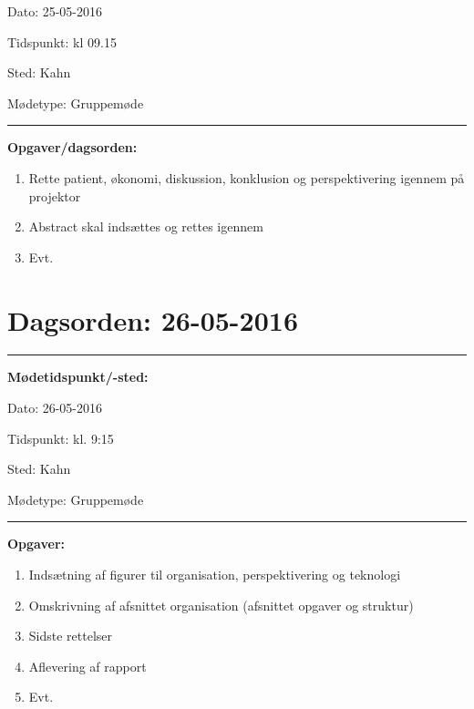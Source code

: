 Dato: \tabto{7em} 25-05-2016

Tidspunkt: \tabto{7em} kl 09.15

Sted: \tabto{7em} Kahn 

Mødetype: \tabto{7em} Gruppemøde \newline


\hrule
\textbf{Opgaver/dagsorden:} \newline
\begin{enumerate}
	\item Rette patient, økonomi, diskussion, konklusion og perspektivering igennem på projektor
	\item Abstract skal indsættes og rettes igennem
	\item Evt. 
\end{enumerate}

\section{Dagsorden: 26-05-2016 }
\hrule
\textbf{Mødetidspunkt/-sted:} 

Dato: \tabto{7em} 26-05-2016

Tidspunkt: \tabto{7em} kl. 9:15

Sted: \tabto{7em} Kahn

Mødetype: \tabto{7em} Gruppemøde \newline


\hrule
\textbf{Opgaver:} \newline
\begin{enumerate}
	\item Indsætning af figurer til organisation, perspektivering og teknologi
	\item Omskrivning af afsnittet organisation (afsnittet opgaver og struktur) 
	\item Sidste rettelser
	\item Aflevering af rapport
	\item Evt. 
\end{enumerate}

